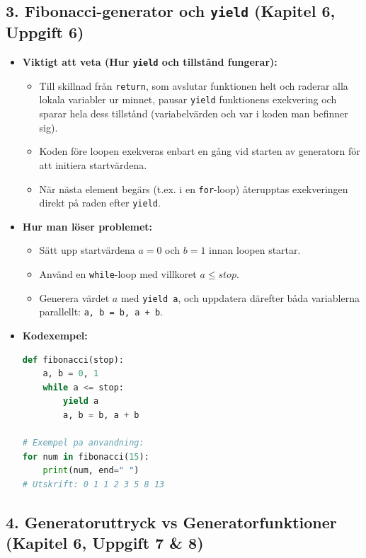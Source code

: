 \documentclass{article}
\begin{document}
\subsection*{3. Fibonacci-generator och \texttt{yield} (Kapitel 6, Uppgift 6)}

\begin{itemize}
    \item \textbf{Viktigt att veta (Hur \texttt{yield} och tillstånd fungerar):}
    \begin{itemize}
        \item Till skillnad från \texttt{return}, som avslutar funktionen helt och raderar alla lokala variabler ur minnet, pausar \texttt{yield} funktionens exekvering och sparar hela dess tillstånd (variabelvärden och var i koden man befinner sig).
        \item Koden före loopen exekveras enbart en gång vid starten av generatorn för att initiera startvärdena.
        \item När nästa element begärs (t.ex. i en \texttt{for}-loop) återupptas exekveringen direkt på raden efter \texttt{yield}.
    \end{itemize}

    \item \textbf{Hur man löser problemet:}
    \begin{itemize}
        \item Sätt upp startvärdena $a = 0$ och $b = 1$ innan loopen startar.
        \item Använd en \texttt{while}-loop med villkoret $a \le stop$.
        \item Generera värdet $a$ med \texttt{yield a}, och uppdatera därefter båda variablerna parallellt: \texttt{a, b = b, a + b}.
    \end{itemize}

    \item \textbf{Kodexempel:}
\begin{lstlisting}[language=Python]
def fibonacci(stop):
    a, b = 0, 1
    while a <= stop:
        yield a
        a, b = b, a + b

# Exempel pa anvandning:
for num in fibonacci(15):
    print(num, end=" ")
# Utskrift: 0 1 1 2 3 5 8 13
\end{lstlisting}
\end{itemize}

\vspace{1cm}

\subsection*{4. Generatoruttryck vs Generatorfunktioner (Kapitel 6, Uppgift 7 \& 8)}
\end{document}
